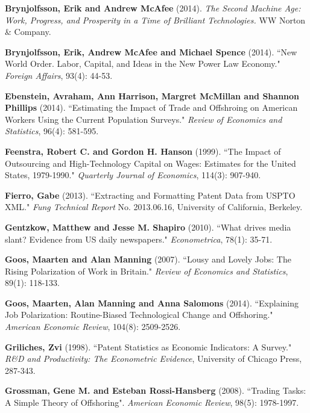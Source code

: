 \documentclass[11pt,a4paper]{article}
\begin{document}
\begin{thebibliography}{9}
	 \textbf{Brynjolfsson, Erik and Andrew McAfee} (2014). \textit{The Second Machine Age: Work, Progress, and Prosperity in a Time of Brilliant Technologies.} WW Norton \& Company.
	
		\textbf{Brynjolfsson, Erik, Andrew McAfee and Michael Spence} (2014). ``New World Order. Labor, Capital, and Ideas in the New Power Law Economy." \textit{Foreign Affairs}, 93(4): 44-53.
	
	 \textbf{Ebenstein, Avraham, Ann Harrison, Margret McMillan and Shannon Phillips} (2014). ``Estimating the Impact of Trade and Offshroing on American Workers Using the Current Population Surveys." \textit{Review of Economics and Statistics}, 96(4): 581-595. 
	
	 \textbf{Feenstra, Robert C. and Gordon H. Hanson} (1999). ``The Impact of Outsourcing and High-Technology Capital on Wages: Estimates for the United States, 1979-1990." \textit{Quarterly Journal of Economics}, 114(3): 907-940.

	 \textbf{Fierro, Gabe} (2013). ``Extracting and Formatting Patent Data from USPTO XML." \textit{Fung Technical Report} No. 2013.06.16, University of California, Berkeley.
	
	 \textbf{Gentzkow, Matthew and Jesse M. Shapiro} (2010). ``What drives media slant? Evidence from US daily newspapers." \textit{Econometrica}, 78(1): 35-71.

	 \textbf{Goos, Maarten and Alan Manning} (2007). ``Lousy and Lovely Jobs: The Rising Polarization of Work in Britain." \textit{Review of Economics and Statistics}, 89(1): 118-133.
	
	 \textbf{Goos, Maarten, Alan Manning and Anna Salomons} (2014). ``Explaining Job Polarization: Routine-Biased Technological Change and Offshoring." \textit{American Economic Review}, 104(8): 2509-2526.
	
	 \textbf{Griliches, Zvi} (1998). ``Patent Statistics as Economic Indicators: A Survey." \textit{R&D and Productivity: The Econometric Evidence}, University of Chicago Press, 287-343.
	
	 \textbf{Grossman, Gene M. and Esteban Rossi-Hansberg} (2008). ``Trading Tasks: A Simple Theory of Offshoring". \textit{American Economic Review}, 98(5): 1978-1997.


\end{thebibliography}
\end{document}
